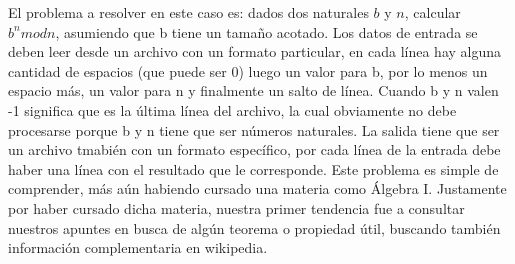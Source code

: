 El problema a resolver en este caso es: dados dos naturales $b$ y $n$, calcular \emph{$b^n mod n$}, asumiendo que b tiene un tamaño acotado. Los datos de entrada se deben leer desde un archivo con un formato particular, en cada línea hay alguna cantidad de espacios (que puede ser 0) luego un valor para b, por lo menos un espacio más, un valor para n y finalmente un salto de línea. Cuando b y n valen -1 significa que es la última línea del archivo, la cual obviamente no debe procesarse porque b y n tiene que ser números naturales. La salida tiene que ser un archivo tmabién con un formato específico, por cada línea de la entrada debe haber una línea con el resultado que le corresponde.
\newline
Este problema es simple de comprender, más aún habiendo cursado una materia como Álgebra I. Justamente por haber cursado dicha materia, nuestra primer tendencia fue a consultar nuestros apuntes en busca de algún teorema o propiedad útil, buscando también información complementaria en wikipedia.

